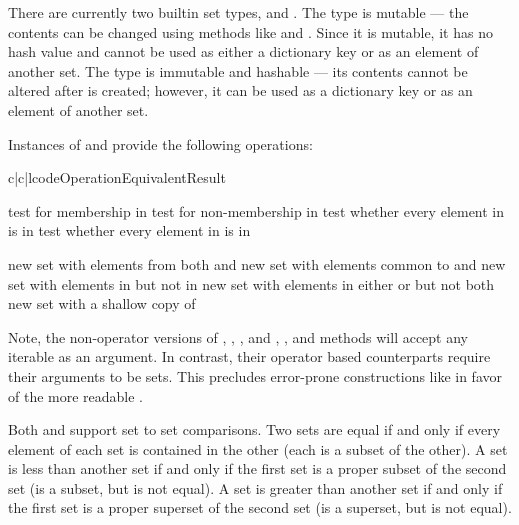 There are currently two builtin set types,  and .
The  type is mutable --- the contents can be changed using methods
like  and .  Since it is mutable, it has no
hash value and cannot be used as either a dictionary key or as an element of
another set.  The  type is immutable and hashable --- its
contents cannot be altered after is created; however, it can be used as
a dictionary key or as an element of another set.

Instances of  and  provide the following operations:

\begin{tableiii}{c|c|l}{code}{Operation}{Equivalent}{Result}

  \hline
         {test  for membership in }
         {test  for non-membership in }
         {test whether every element in  is in }
         {test whether every element in  is in }

  \hline
         {new set with elements from both  and }
         {new set with elements common to  and }
         {new set with elements in  but not in }
         {new set with elements in either  or  but not both}
         {new set with a shallow copy of }
\end{tableiii}

Note, the non-operator versions of , ,
, and ,
, and  methods will accept any
iterable as an argument.  In contrast, their operator based counterparts
require their arguments to be sets.  This precludes error-prone constructions
like  in favor of the more readable
.

Both  and  support set to set comparisons.
Two sets are equal if and only if every element of each set is contained in
the other (each is a subset of the other).
A set is less than another set if and only if the first set is a proper
subset of the second set (is a subset, but is not equal).
A set is greater than another set if and only if the first set is a proper
superset of the second set (is a superset, but is not equal).

